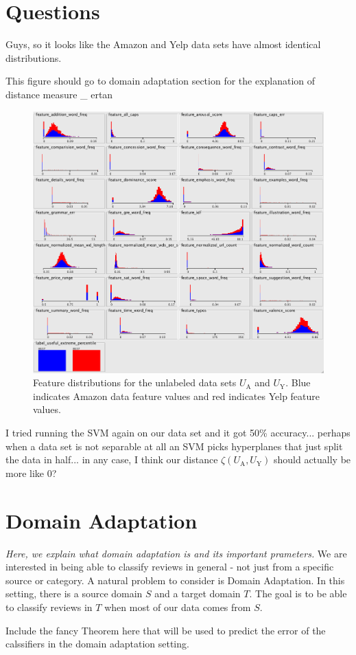 \documentclass[letterpaper]{article}
\begin{document}
\section{Questions}

Guys, so it looks like the Amazon and Yelp data sets have almost identical distributions.

This figure should go to domain adaptation section for the explanation
of distance measure \_ ertan

\begin{figure}[h]
	\centering
	\includegraphics[width=0.5\linewidth]{adaptation_unlabeled_features}
	\caption{Feature distributions for the unlabeled data sets $U_{\textrm{A}}$ and $U_{\textrm{Y}}$.  
	Blue indicates Amazon data feature values and red indicates Yelp feature values.}
\end{figure}

I tried running the SVM again on our data set and it got 50\% accuracy... perhaps when a data set is not separable at all an SVM picks hyperplanes that just split the data in half... in any case, I think our distance $\zeta(U_{\textrm{A}}, U_{\textrm{Y}})$ should actually be more like 0?

\section{Domain Adaptation}
\label{sec:background}

\emph{Here, we explain what domain adaptation is and its important
prameters.}
We are interested in being able to classify reviews in general - not
just from a specific source or category. A natural problem to consider
is Domain Adaptation. In this setting, there is a source domain $S$
and a target domain $T$. The goal is to be able to classify reviews in
$T$ when most of our data comes from $S$. 

Include the fancy Theorem here that will be used to predict the error
of the calssifiers in the domain adaptation setting.
\end{document}
